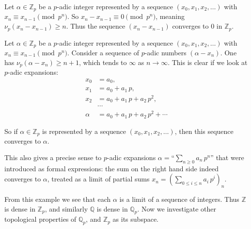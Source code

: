 \documentclass{article}
\newcommand{\ZZ}{\mathbb{Z}}
\newcommand{\QQ}{\mathbb{Q}}
\newcommand{\examplesymbol}{$\blacktriangle$}
\renewcommand{\qedsymbol}{$\blacksquare$}
\theoremstyle{myplain}
\theoremstyle{mydefinition}
\newenvironment{example}
  {\pushQED{\qed}\renewcommand{\qedsymbol}{\examplesymbol}\examplex}
  {\popQED\endexamplex}
\begin{document}
\begin{example}
  Let $\alpha \in \ZZ_p$ be a $p$-adic integer represented by a sequence
  $(x_0, x_1, x_2, \ldots)$ with $x_n \equiv x_{n-1} \pmod{p^n}$.
  So $x_n - x_{n-1} \equiv 0 \pmod{p^n}$, meaning
  $ \nu_p (x_n - x_{n-1}) \ge n$. Thus the sequence $(x_n - x_{n-1})$ converges
  to $0$ in $\ZZ_p$.
\end{example}

\begin{example}
  Let $\alpha \in \ZZ_p$ be a $p$-adic integer represented by a sequence
  $(x_0, x_1, x_2, \ldots)$ with $x_n \equiv x_{n-1} \pmod{p^n}$. Consider
  a sequence of $p$-adic numbers $(\alpha - x_n)$. One has
  $\nu_p (\alpha - x_n) \ge n+1$, which tends to $\infty$ as $n \to
  \infty$. This is clear if we look at $p$-adic expansions:
  \begin{align*}
    x_0 & = a_0, \\
    x_1 & = a_0 + a_1\,p,\\
    x_2 & = a_0 + a_1\,p + a_2\,p^2,\\
        & \cdots \\
    \alpha & = a_0 + a_1\,p + a_2\,p^2 + \cdots
  \end{align*}

  So if $\alpha \in \ZZ_p$ is represented by a sequence
  $(x_0, x_1, x_2, \ldots)$, then this sequence converges to $\alpha$.

  This also gives a precise sense to $p$-adic expansions
  $\alpha = \text{``}\sum_{n\ge 0} a_n \, p^n\text{''}$ that were introduced as
  formal expressions: the sum on the right hand side indeed converges to
  $\alpha$, treated as a limit of partial sums
  $x_n = (\sum_{0 \le i \le n} a_i \, p^i)_n$.
\end{example}

From this example we see that each $\alpha$ is a limit of a sequence of
integers. Thus $\ZZ$ is dense in $\ZZ_p$, and similarly $\QQ$ is dense in
$\QQ_p$. Now we investigate other topological properties of $\QQ_p$, and $\ZZ_p$
as its subspace.
\end{document}
